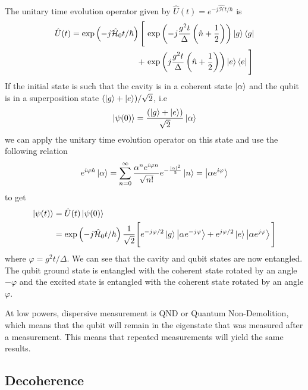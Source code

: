 \begin{itemize}
The unitary time evolution operator given by $\hat{U}(t)=e^{-j\hat{\mathcal{H}}t/\hbar}$ is
\begin{align}
\begin{split}
\hat{U}(t) = \text{exp}\left(-j\hat{\mathcal{H}}_0t/\hbar\right)\Bigg[&\text{ exp}\left(-j\frac{g^2t}{\Delta}\left(\hat{n}+\frac{1}{2}\right)\right)\ket{g}\bra{g}\\
+&\text{ exp}\left(j\frac{g^2t}{\Delta}\left(\hat{n}+\frac{1}{2}\right)\right)\ket{e}\bra{e}\Bigg]
\end{split}
\end{align}
If the initial state is such that the cavity is in a coherent state $\ket{\alpha}$ and the qubit is in a superposition state $(\ket{g}+\ket{e})/\sqrt{2}$, i.e
\begin{equation}
\ket{\psi(0)} = \frac{(\ket{g}+\ket{e})}{\sqrt{2}}\ket{\alpha}
\end{equation}
we can apply the unitary time evolution operator on this state and use the following relation
\begin{equation}
e^{i\varphi\hat{n}}\ket{\alpha} = \sum_{n=0}^\infty \frac{\alpha^ne^{i\varphi n}}{\sqrt{n!}}e^{-\frac{|\alpha|^2}{2}}\ket{n} = \ket{\alpha e^{i\varphi}}
\end{equation}
to get
\begin{align}
\begin{split}
\ket{\psi(t)} &= \hat{U}(t)\ket{\psi(0)}\\
&= \text{exp}\left(-j\hat{\mathcal{H}}_0t/\hbar\right)\frac{1}{\sqrt{2}}\Bigg[e^{-j\varphi/2}\ket{g}\ket{\alpha e^{-j\varphi}}+e^{j\varphi/2}\ket{e}\ket{\alpha e^{j\varphi}}\Bigg]
\end{split}
\end{align}
where $\varphi = g^2t/\Delta$. We can see that the cavity and qubit states are now entangled. The qubit ground state is entangled with the coherent state rotated by an angle $-\varphi$ and the excited state is entangled with the coherent state rotated by an angle $\varphi$.

At low powers, dispersive measurement is QND or Quantum Non-Demolition, which means that the qubit will remain in the eigenstate that was measured after a measurement. This means that repeated measurements will yield the same results.
\end{itemize}

\subsection{Decoherence}

